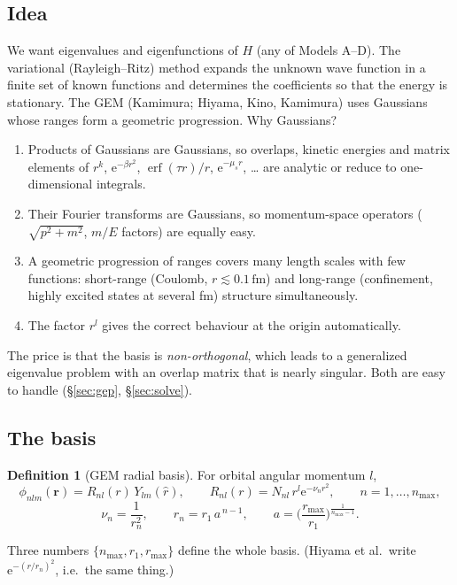 \documentclass[11pt,a4paper]{article}
\numberwithin{equation}{section}
\theoremstyle{definition}
\newtheorem{definition}{Definition}[section]
\theoremstyle{plain}
\theoremstyle{remark}
\numberwithin{algorithm}{section}
\newcommand{\vr}{\bm r}
\newcommand{\ee}{\mathrm{e}}
\newcommand{\erf}{\operatorname{erf}}
\newcommand{\mus}{\mu_s}
\newcommand{\fm}{\,\mathrm{fm}}
\begin{document}
\subsection{Idea}
We want eigenvalues and eigenfunctions of $H$ (any of Models A--D). The variational (Rayleigh--Ritz) method expands the unknown wave function in a finite set of known functions and determines the coefficients so that the energy is stationary. The GEM (Kamimura; Hiyama, Kino, Kamimura) uses Gaussians whose ranges form a geometric progression. Why Gaussians?
\begin{enumerate}[leftmargin=1.5em,itemsep=2pt]
\item Products of Gaussians are Gaussians, so overlaps, kinetic energies and matrix elements of $r^k$, $\ee^{-\beta r^2}$, $\erf(\tau r)/r$, $\ee^{-\mus r}$, \dots{} are analytic or reduce to one-dimensional integrals.
\item Their Fourier transforms are Gaussians, so momentum-space operators ($\sqrt{p^2+m^2}$, $m/E$ factors) are equally easy.
\item A geometric progression of ranges covers many length scales with few functions: short-range (Coulomb, $r\lesssim0.1\fm$) and long-range (confinement, highly excited states at several fm) structure simultaneously.
\item The factor $r^l$ gives the correct behaviour at the origin automatically.
\end{enumerate}
The price is that the basis is \emph{non-orthogonal}, which leads to a generalized eigenvalue problem with an overlap matrix that is nearly singular. Both are easy to handle (\S\ref{sec:gep}, \S\ref{sec:solve}).

\subsection{The basis}\label{sec:basis}
\begin{definition}[GEM radial basis]
For orbital angular momentum $l$,
\begin{equation}
\phi_{nlm}(\vr)=R_{nl}(r)\,Y_{lm}(\hat r),\qquad R_{nl}(r)=N_{nl}\,r^l\ee^{-\nu_nr^2},\qquad n=1,\dots,n_{\max},
\label{eq:basis}
\end{equation}
\begin{equation}
\nu_n=\frac{1}{r_n^2},\qquad r_n=r_1\,a^{\,n-1},\qquad a=\Big(\frac{r_{\max}}{r_1}\Big)^{\frac1{n_{\max}-1}} .
\end{equation}
\end{definition}
Three numbers $\{n_{\max},r_1,r_{\max}\}$ define the whole basis. (Hiyama et al.\ write $\ee^{-(r/r_n)^2}$, i.e.\ the same thing.)
\end{document}
